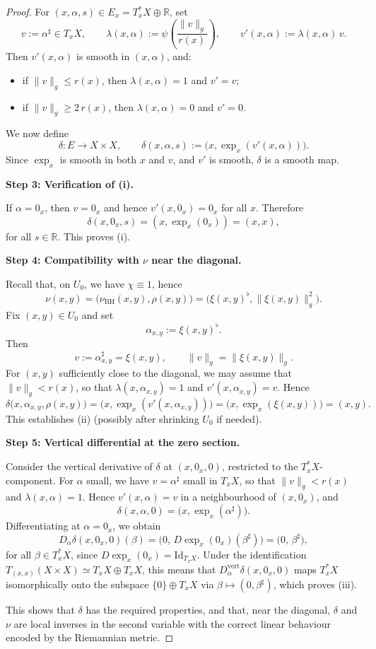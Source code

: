 \documentclass{amsart}
\newcounter{ex}
\newcounter{re}
\begin{document}
{\begin{proof}
For $(x,\alpha,s)\in E_x = T_x^\ast X\oplus\mathbb{R}$, set
\[
v := \alpha^\sharp \in T_xX,
\qquad
\lambda(x,\alpha) := \psi\!\left(\frac{\|v\|_g}{r(x)}\right),
\qquad
v'(x,\alpha) := \lambda(x,\alpha)\,v.
\]
Then $v'(x,\alpha)$ is smooth in $(x,\alpha)$, and:
\begin{itemize}
  \item if $\|v\|_g \le r(x)$, then $\lambda(x,\alpha)=1$ and $v'=v$;
  \item if $\|v\|_g \ge 2\,r(x)$, then $\lambda(x,\alpha)=0$ and $v'=0$.
\end{itemize}

We now define
\[
\delta : E \longrightarrow X\times X,\qquad
\delta(x,\alpha,s) := \bigl(x,\exp_x(v'(x,\alpha))\bigr).
\]
Since $\exp_x$ is smooth in both $x$ and $v$, and $v'$ is smooth,
$\delta$ is a smooth map.

\medskip
\noindent\textbf{Step 3: Verification of (i).}

If $\alpha=0_x$, then $v=0_x$ and hence $v'(x,0_x)=0_x$ for all $x$.
Therefore
\[
\delta(x,0_x,s) = (x,\exp_x(0_x)) = (x,x),
\]
for all $s\in\mathbb{R}$.
This proves (i).

\medskip
\noindent\textbf{Step 4: Compatibility with $\nu$ near the diagonal.}

Recall that, on $U_0$, we have 
$\chi\equiv 1$, hence
\[
\nu(x,y) = \bigl(\nu_{\mathrm{BH}}(x,y),\rho(x,y)\bigr)
         = \bigl(\xi(x,y)^\flat, \|\xi(x,y)\|_g^2\bigr).
\]
Fix $(x,y)\in U_0$ and set
\[
\alpha_{x,y} := \xi(x,y)^\flat.
\]
Then
\[
v := \alpha_{x,y}^\sharp = \xi(x,y),
\qquad
\|v\|_g = \|\xi(x,y)\|_g.
\]
For $(x,y)$ sufficiently close to the diagonal, we may assume that
$\|v\|_g < r(x)$, so that $\lambda(x,\alpha_{x,y})=1$ and 
$v'(x,\alpha_{x,y}) = v$.
Hence
\[
\delta\bigl(x,\alpha_{x,y},\rho(x,y)\bigr)
= \bigl(x,\exp_x(v'(x,\alpha_{x,y}))\bigr)
= \bigl(x,\exp_x(\xi(x,y))\bigr)
= (x,y).
\]
This establishes (ii) (possibly after shrinking $U_0$ if needed).

\medskip
\noindent\textbf{Step 5: Vertical differential at the zero section.}

Consider the vertical derivative of $\delta$ at $(x,0_x,0)$, restricted to
the $T_x^\ast X$-component. For $\alpha$ small, we have 
$v=\alpha^\sharp$ small in $T_xX$, so that $\|v\|_g < r(x)$ and 
$\lambda(x,\alpha)=1$. Hence $v'(x,\alpha)=v$ in a neighbourhood of
$(x,0_x)$, and
\[
\delta(x,\alpha,0)
= \bigl(x,\exp_x(\alpha^\sharp)\bigr).
\]
Differentiating at $\alpha=0_x$, we obtain
\[
D_\alpha\delta(x,0_x,0)(\beta)
= \bigl(0,\, D\exp_x(0_x)(\beta^\sharp)\bigr)
= \bigl(0,\,\beta^\sharp\bigr),
\]
for all $\beta\in T_x^\ast X$, since $D\exp_x(0_x)=\mathrm{Id}_{T_xX}$.
Under the identification $T_{(x,x)}(X\times X)\simeq T_xX\oplus T_xX$,
this means that $D^{\mathrm{vert}}_\alpha\delta(x,0_x,0)$ maps 
$T_x^\ast X$ isomorphically onto the subspace $\{0\}\oplus T_xX$ via
$\beta\mapsto (0,\beta^\sharp)$, which proves (iii).

\medskip
This shows that $\delta$ has the required properties, and that,
near the diagonal, $\delta$ and $\nu$ are local inverses in the second
variable with the correct linear behaviour encoded by the Riemannian metric.
\end{proof}

}
\end{document}
